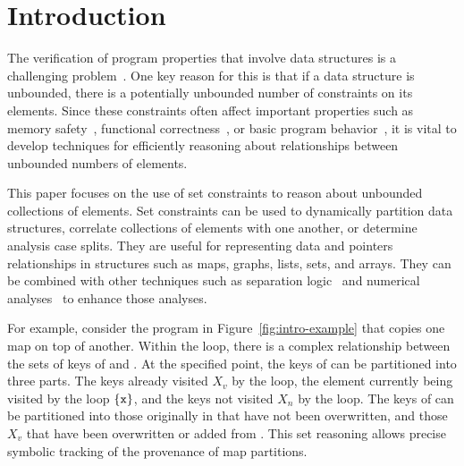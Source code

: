 \section{Introduction}
\label{s:1:intro}
The verification of program properties that
involve data structures is a challenging problem~\cite{jahob:thesis:07,compass:popl:11,fixbag:cav:11,celia:vmcai:12,ab:ecoop:13,hoo:14:sas,memcad:15:sas}.
One key reason for this is that
if a data structure is unbounded, there is a potentially unbounded number of constraints on its elements.  Since these constraints often affect important properties such as memory safety~\cite{memcad:15:sas}, functional correctness~\cite{fixbag:cav:11}, or basic program behavior~\cite{hoo:14:sas}, it is vital to develop techniques for efficiently reasoning about relationships between unbounded numbers of elements.

This paper focuses on the use of set constraints to reason about unbounded collections of elements.  Set constraints can be used to dynamically partition data structures, correlate collections of elements with one another, or determine analysis case splits.  They are useful for representing data and pointers relationships in structures such as maps, graphs, lists, sets, and arrays.  They can be combined with other techniques such as separation logic~\cite{hoo:14:sas,memcad:15:sas} and numerical analyses~\cite{quicr:cav:14} to enhance those analyses.

For example, consider the program in Figure~\ref{fig:intro-example}
that copies one map on top of another.
Within the loop, there is a complex relationship between the sets of
keys of  and .
At the specified point, the keys of  can be partitioned into
three parts.
The keys already visited $X_v$ by the loop, the element currently being
visited by the loop $\{\texttt{x}\}$, and the keys not visited $X_n$ by
the loop.
The keys of  can be partitioned into those originally in
 that have not been overwritten, and those $X_v$ that have
been overwritten or added from .
This set reasoning allows precise symbolic tracking of the provenance
of map partitions.

